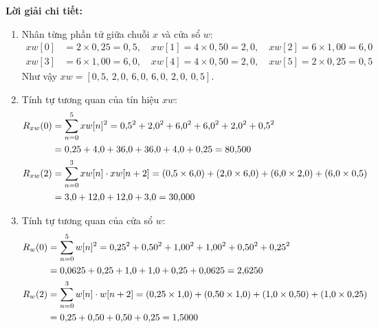 \noindent\textbf{Lời giải chi tiết:}
\begin{enumerate}[label=\alph*)]
    \item Nhân từng phần tử giữa chuỗi $x$ và cửa sổ $w$:
    \begin{align}
        xw[0] &= 2 \times 0{,}25 = 0{,}5, \quad xw[1] = 4 \times 0{,}50 = 2{,}0, \quad xw[2] = 6 \times 1{,}00 = 6{,}0 \\
        xw[3] &= 6 \times 1{,}00 = 6{,}0, \quad xw[4] = 4 \times 0{,}50 = 2{,}0, \quad xw[5] = 2 \times 0{,}25 = 0{,}5
    \end{align}
    Như vậy $xw = [0{,}5,\, 2{,}0,\, 6{,}0,\, 6{,}0,\, 2{,}0,\, 0{,}5]$.

    \item Tính tự tương quan của tín hiệu $xw$:
    \begin{align}
        R_{xw}(0) &= \sum_{n=0}^{5} xw[n]^2 = 0{,}5^2 + 2{,}0^2 + 6{,}0^2 + 6{,}0^2 + 2{,}0^2 + 0{,}5^2 \notag \\
        &= 0{,}25 + 4{,}0 + 36{,}0 + 36{,}0 + 4{,}0 + 0{,}25 = 80{,}500 \\
        R_{xw}(2) &= \sum_{n=0}^{3} xw[n] \cdot xw[n+2] = (0{,}5 \times 6{,}0) + (2{,}0 \times 6{,}0) + (6{,}0 \times 2{,}0) + (6{,}0 \times 0{,}5) \notag \\
        &= 3{,}0 + 12{,}0 + 12{,}0 + 3{,}0 = 30{,}000
    \end{align}

    \item Tính tự tương quan của cửa sổ $w$:
    \begin{align}
        R_w(0) &= \sum_{n=0}^{5} w[n]^2 = 0{,}25^2 + 0{,}50^2 + 1{,}00^2 + 1{,}00^2 + 0{,}50^2 + 0{,}25^2 \notag \\
        &= 0{,}0625 + 0{,}25 + 1{,}0 + 1{,}0 + 0{,}25 + 0{,}0625 = 2{,}6250 \\
        R_w(2) &= \sum_{n=0}^{3} w[n] \cdot w[n+2] = (0{,}25 \times 1{,}0) + (0{,}50 \times 1{,}0) + (1{,}0 \times 0{,}50) + (1{,}0 \times 0{,}25) \notag \\
        &= 0{,}25 + 0{,}50 + 0{,}50 + 0{,}25 = 1{,}5000
    \end{align}


\end{enumerate}
